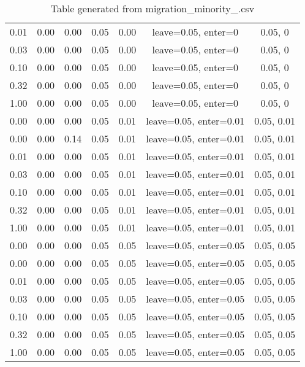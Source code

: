 \begin{table}[ht]
\begin{table}[ht]
\begin{tabular}{|ccccccc}
  0.01 & 0.00 & 0.00 & 0.05 & 0.00 & leave=0.05, enter=0 & 0.05, 0 \\ 
  0.03 & 0.00 & 0.00 & 0.05 & 0.00 & leave=0.05, enter=0 & 0.05, 0 \\ 
  0.10 & 0.00 & 0.00 & 0.05 & 0.00 & leave=0.05, enter=0 & 0.05, 0 \\ 
  0.32 & 0.00 & 0.00 & 0.05 & 0.00 & leave=0.05, enter=0 & 0.05, 0 \\ 
  1.00 & 0.00 & 0.00 & 0.05 & 0.00 & leave=0.05, enter=0 & 0.05, 0 \\ 
  0.00 & 0.00 & 0.00 & 0.05 & 0.01 & leave=0.05, enter=0.01 & 0.05, 0.01 \\ 
  0.00 & 0.00 & 0.14 & 0.05 & 0.01 & leave=0.05, enter=0.01 & 0.05, 0.01 \\ 
  0.01 & 0.00 & 0.00 & 0.05 & 0.01 & leave=0.05, enter=0.01 & 0.05, 0.01 \\ 
  0.03 & 0.00 & 0.00 & 0.05 & 0.01 & leave=0.05, enter=0.01 & 0.05, 0.01 \\ 
  0.10 & 0.00 & 0.00 & 0.05 & 0.01 & leave=0.05, enter=0.01 & 0.05, 0.01 \\ 
  0.32 & 0.00 & 0.00 & 0.05 & 0.01 & leave=0.05, enter=0.01 & 0.05, 0.01 \\ 
  1.00 & 0.00 & 0.00 & 0.05 & 0.01 & leave=0.05, enter=0.01 & 0.05, 0.01 \\ 
  0.00 & 0.00 & 0.00 & 0.05 & 0.05 & leave=0.05, enter=0.05 & 0.05, 0.05 \\ 
  0.00 & 0.00 & 0.00 & 0.05 & 0.05 & leave=0.05, enter=0.05 & 0.05, 0.05 \\ 
  0.01 & 0.00 & 0.00 & 0.05 & 0.05 & leave=0.05, enter=0.05 & 0.05, 0.05 \\ 
  0.03 & 0.00 & 0.00 & 0.05 & 0.05 & leave=0.05, enter=0.05 & 0.05, 0.05 \\ 
  0.10 & 0.00 & 0.00 & 0.05 & 0.05 & leave=0.05, enter=0.05 & 0.05, 0.05 \\ 
  0.32 & 0.00 & 0.00 & 0.05 & 0.05 & leave=0.05, enter=0.05 & 0.05, 0.05 \\ 
  1.00 & 0.00 & 0.00 & 0.05 & 0.05 & leave=0.05, enter=0.05 & 0.05, 0.05 \\ 
   \hline
\end{tabular}
\caption{Table generated from migration_minority_.csv} 
\end{table}
\end{table}
